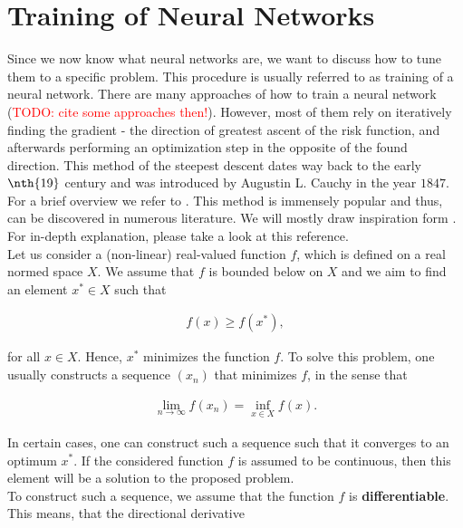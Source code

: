 \section{Training of Neural Networks}\label{sec:training_of_nn}
Since we now know what neural networks are, we want to discuss how to tune them to a specific problem. This procedure is usually referred to as training of a neural network. There are many approaches of how to train a neural network (\textcolor{red}{TODO: cite some approaches then!}). However, most of them rely on iteratively finding the gradient - the direction of greatest ascent of the risk function, and afterwards performing an optimization step in the opposite of the found direction. This method of the steepest descent dates way back to the early $\nth{19}$ century and was introduced by Augustin L. Cauchy in the year $1847$. For a brief overview we refer to \cite{lemarechal2012cauchy}. This method is immensely popular and thus, can be discovered in numerous literature. We will mostly draw inspiration form \cite[Chapter~XV]{kantorovich2016functional}. For in-depth explanation, please take a look at this reference.\\
Let us consider a (non-linear) real-valued function $f$, which is defined on a real normed space $X$. We assume that $f$ is bounded below on $X$ and we aim to find an element $x^{\ast}\in X$ such that

\begin{align*}
f(x) \geq f(x^{\ast}),
\end{align*}

for all $x\in X$. Hence, $x^{\ast}$ minimizes the function $f$. To solve this problem, one usually constructs a sequence $(x_n)$ that minimizes $f$, in the sense that

\begin{align*}
\lim_{n\to\infty} f(x_n) = \inf_{x\in X} f(x).
\end{align*}

In certain cases, one can construct such a sequence such that it converges to an optimum $x^{\ast}$. If the considered function $f$ is assumed to be continuous, then this element will be a solution to the proposed problem.\\
To construct such a sequence, we assume that the function $f$ is \textbf{differentiable}. This means, that the directional derivative

